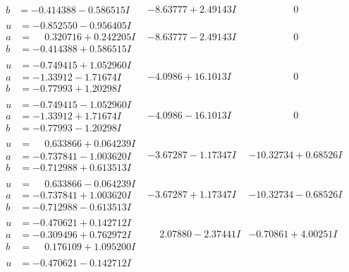 \documentclass[1p]{elsarticle_modified}
\theoremstyle{definition}
\begin{document}
$$\begin{array}{c|c|c}
\begin{aligned}
b &= -0.414388 - 0.586515 I\end{aligned}
 & -8.63777 + 2.49143 I & \phantom{-0.000000 } 0 \\ \hline\begin{aligned}
u &= -0.852550 - 0.956405 I \\
a &= \phantom{-}0.320716 + 0.242205 I \\
b &= -0.414388 + 0.586515 I\end{aligned}
 & -8.63777 - 2.49143 I & \phantom{-0.000000 } 0 \\ \hline\begin{aligned}
u &= -0.749415 + 1.052960 I \\
a &= -1.33912 - 1.71674 I \\
b &= -0.77993 + 1.20298 I\end{aligned}
 & -4.0986 + 16.1013 I & \phantom{-0.000000 } 0 \\ \hline\begin{aligned}
u &= -0.749415 - 1.052960 I \\
a &= -1.33912 + 1.71674 I \\
b &= -0.77993 - 1.20298 I\end{aligned}
 & -4.0986 - 16.1013 I & \phantom{-0.000000 } 0 \\ \hline\begin{aligned}
u &= \phantom{-}0.633866 + 0.064239 I \\
a &= -0.737841 - 1.003620 I \\
b &= -0.712988 + 0.613513 I\end{aligned}
 & -3.67287 - 1.17347 I & -10.32734 + 0.68526 I \\ \hline\begin{aligned}
u &= \phantom{-}0.633866 - 0.064239 I \\
a &= -0.737841 + 1.003620 I \\
b &= -0.712988 - 0.613513 I\end{aligned}
 & -3.67287 + 1.17347 I & -10.32734 - 0.68526 I \\ \hline\begin{aligned}
u &= -0.470621 + 0.142712 I \\
a &= -0.309496 + 0.762972 I \\
b &= \phantom{-}0.176109 + 1.095200 I\end{aligned}
 & \phantom{-}2.07880 - 2.37441 I & -0.70861 + 4.00251 I \\ \hline\begin{aligned}
u &= -0.470621 - 0.142712 I \\

\end{aligned}
\end{array}$$
\end{document}

